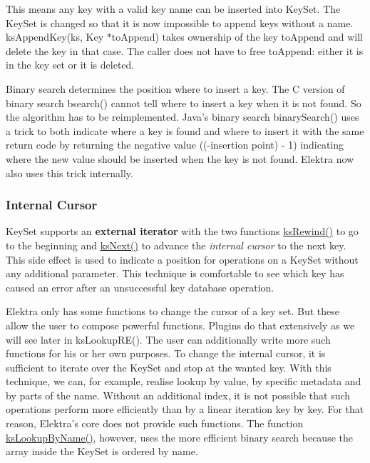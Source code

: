 This means any key with a valid key name can be inserted into {\ttfamily Key\+Set}. The {\ttfamily Key\+Set} is changed so that it is now impossible to append keys without a name. {\ttfamily ks\+Append\+Key(ks, Key $\ast$to\+Append)} takes ownership of the key {\ttfamily to\+Append} and will delete the key in that case. The caller does not have to free {\ttfamily to\+Append}\+: either it is in the key set or it is deleted.

Binary search determines the position where to insert a key. The C version of binary search {\ttfamily bsearch()} cannot tell where to insert a key when it is not found. So the algorithm has to be reimplemented. Java's binary search {\ttfamily binary\+Search()} uses a trick to both indicate where a key is found and where to insert it with the same return code by returning the negative value {\ttfamily ((-\/insertion point) -\/ 1)} indicating where the new value should be inserted when the key is not found. Elektra now also uses this trick internally.

\subsubsection*{Internal Cursor}

{\ttfamily Key\+Set} supports an {\bfseries external iterator} with the two functions {\ttfamily \hyperlink{group__keyset_gabe793ff51f1728e3429c84a8a9086b70}{ks\+Rewind()}} to go to the beginning and {\ttfamily \hyperlink{group__keyset_ga317321c9065b5a4b3e33fe1c399bcec9}{ks\+Next()}} to advance the {\itshape internal cursor} to the next key. This side effect is used to indicate a position for operations on a {\ttfamily Key\+Set} without any additional parameter. This technique is comfortable to see which key has caused an error after an unsuccessful key database operation.

Elektra only has some functions to change the cursor of a key set. But these allow the user to compose powerful functions. Plugins do that extensively as we will see later in {\ttfamily ks\+Lookup\+R\+E()}. The user can additionally write more such functions for his or her own purposes. To change the internal cursor, it is sufficient to iterate over the {\ttfamily Key\+Set} and stop at the wanted key. With this technique, we can, for example, realise lookup by value, by specific metadata and by parts of the name. Without an additional index, it is not possible that such operations perform more efficiently than by a linear iteration key by key. For that reason, Elektra's core does not provide such functions. The function {\ttfamily \hyperlink{group__keyset_gad2e30fb6d4739d917c5abb2ac2f9c1a1}{ks\+Lookup\+By\+Name()}}, however, uses the more efficient binary search because the array inside the {\ttfamily Key\+Set} is ordered by name.

